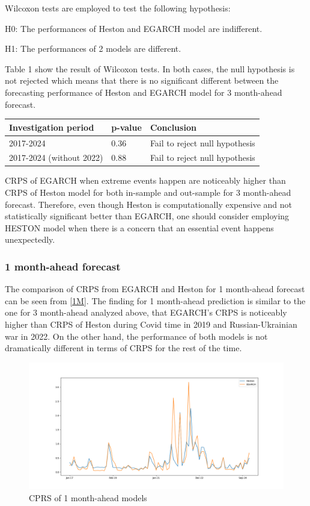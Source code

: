 \documentclass[12pt,a4paper]{article}
\newcommand\colorAutoref[1]{{\hypersetup{linkcolor=black}\autoref{#1}}}
\numberwithin{equation}{section}
\begin{document}
Wilcoxon tests are employed to test the following hypothesis:

H0: The performances of Heston and EGARCH model are indifferent.

H1: The performances of 2 models are different.

Table 1 show the result of Wilcoxon tests. In both cases, the null hypothesis is not rejected which means that there is no significant different between the forecasting performance of Heston and EGARCH model for 3 month-ahead forecast.


\begin{table}[h!]
\centering
\begin{tabular}{@{}lll@{}}
\toprule
Investigation period     & p-value & Conclusion                     \\ \midrule
2017-2024                & 0.36    & Fail to reject null hypothesis \\
2017-2024 (without 2022) & 0.88    & Fail to reject null hypothesis \\ \bottomrule
\end{tabular}
\end{table}

CRPS of EGARCH when extreme events happen are noticeably higher than CRPS of Heston model for both in-sample and out-sample for 3 month-ahead forecast. Therefore, even though Heston is computationally expensive and not statistically significant better than EGARCH, one should consider employing HESTON model when there is a concern that an essential event happens unexpectedly. 


\subsubsection{1 month-ahead forecast}

The comparison of CRPS from EGARCH and Heston for 1 month-ahead forecast can be seen from \colorAutoref{1M}. The finding for 1 month-ahead prediction is similar to the one for 3 month-ahead analyzed above, that EGARCH's CRPS is noticeably higher than CRPS of Heston during Covid time in 2019 and Russian-Ukrainian war in 2022. On the other hand, the performance of both models is not dramatically different in terms of CRPS for the rest of the time.

\begin{figure}[h!] 
\includegraphics[scale=1,width=1\linewidth,height=0.4\textheight]{onemonthahead.png}
\caption{CPRS of 1 month-ahead models}
\label{1M}
\end{figure}
\end{document}
